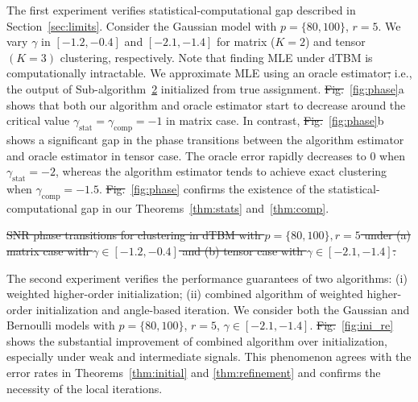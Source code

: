 \documentclass[twoside]{article}
\theoremstyle{definition}
\theoremstyle{definition}
\providecommand{\DIFaddtex}[1]{{\protect\color{blue}\uwave{#1}}} %
\providecommand{\DIFdeltex}[1]{{\protect\color{red}\sout{#1}}}                      %
\providecommand{\DIFaddbegin}{} %
\providecommand{\DIFaddend}{} %
\providecommand{\DIFdelbegin}{} %
\providecommand{\DIFdelend}{} %
\providecommand{\DIFdelFL}[1]{\DIFdel{#1}} %
\providecommand{\DIFadd}[1]{\texorpdfstring{\DIFaddtex{#1}}{#1}} %
\providecommand{\DIFdel}[1]{\texorpdfstring{\DIFdeltex{#1}}{}} %
\newcommand{\DIFscaledelfig}{0.5}
\newlength{\DIFdelgraphicswidth} %
\newlength{\DIFdelgraphicsheight} %
\newcommand{\DIFaddincludegraphics}[2][]{{\color{blue}\fbox{\DIFOincludegraphics[#1]{#2}}}} %
\newcommand{\DIFdelincludegraphics}[2][]{%
\sbox{\DIFdelgraphicsbox}{\DIFOincludegraphics[#1]{#2}}%
\settoboxwidth{\DIFdelgraphicswidth}{\DIFdelgraphicsbox} %
\settoboxtotalheight{\DIFdelgraphicsheight}{\DIFdelgraphicsbox} %
\scalebox{\DIFscaledelfig}{%
\parbox[b]{\DIFdelgraphicswidth}{\usebox{\DIFdelgraphicsbox}\\[-\baselineskip] \rule{\DIFdelgraphicswidth}{0em}}\llap{\resizebox{\DIFdelgraphicswidth}{\DIFdelgraphicsheight}{%
\setlength{\unitlength}{\DIFdelgraphicswidth}%
\begin{picture}(1,1)%
\thicklines\linethickness{2pt} %
{\color[rgb]{1,0,0}\put(0,0){\framebox(1,1){}}}%
{\color[rgb]{1,0,0}\put(0,0){\line( 1,1){1}}}%
{\color[rgb]{1,0,0}\put(0,1){\line(1,-1){1}}}%
\end{picture}%
}\hspace*{3pt}}} %
} %
\DeclareRobustCommand{\DIFaddbegin}{\DIFOaddbegin \let\includegraphics\DIFaddincludegraphics} %
\DeclareRobustCommand{\DIFaddend}{\DIFOaddend \let\includegraphics\DIFOincludegraphics} %
\DeclareRobustCommand{\DIFdelbegin}{\DIFOdelbegin \let\includegraphics\DIFdelincludegraphics} %
\DeclareRobustCommand{\DIFdelend}{\DIFOaddend \let\includegraphics\DIFOincludegraphics} %
\begin{document}
The first experiment verifies  statistical-computational gap described in Section~\ref{sec:limits}. Consider the Gaussian model with $p = \{80, 100\}$, $r = 5$. We vary $\gamma $ in $ [-1.2, -0.4]$ and $[-2.1, -1.4]$ for matrix ($K=2$) and tensor $(K = 3)$ clustering, respectively. Note that finding MLE under dTBM is computationally intractable. We approximate MLE using an oracle estimator\DIFdelbegin \DIFdel{; }\DIFdelend \DIFaddbegin \DIFadd{, }\DIFaddend i.e., the output of Sub-algorithm~\hyperref[alg:main]{2} initialized from true assignment. \DIFdelbegin \DIFdel{Fig.}\DIFdelend \DIFaddbegin \DIFadd{Figure}\DIFaddend ~\ref{fig:phase}a shows that both our algorithm and oracle estimator start to decrease around the critical value $\gamma_{\text{stat}}  = \gamma_{\text{comp}}  = -1$ in matrix case. In contrast, \DIFdelbegin \DIFdel{Fig.}\DIFdelend \DIFaddbegin \DIFadd{Figure}\DIFaddend ~\ref{fig:phase}b shows a significant gap in the phase transitions between the algorithm estimator and oracle estimator in tensor case. The oracle error rapidly decreases to 0 when $\gamma_{\text{stat}} = -2$, whereas the algorithm estimator tends to achieve exact clustering when $\gamma_{\text{comp}} = -1.5$. \DIFdelbegin \DIFdel{Fig.}\DIFdelend \DIFaddbegin \DIFadd{Figure}\DIFaddend ~\ref{fig:phase} confirms the existence of the statistical-computational gap in our Theorems~\ref{thm:stats} and~\ref{thm:comp}. 

\DIFdelbegin %
{%
\DIFdelFL{SNR phase transitions for clustering in dTBM with $p = \{80, 100\}, r = 5$ under (a) matrix case with $\gamma \in [-1.2, -0.4]$ and (b) tensor case with $ \gamma \in [-2.1, -1.4]$.
    }}

\DIFdelend The second experiment verifies the performance guarantees of two algorithms: (i) weighted higher-order initialization; (ii) combined algorithm of weighted higher-order initialization and angle-based iteration. We consider both the Gaussian and Bernoulli models with $p = \{80, 100\}$, $r = 5$, $\gamma \in [-2.1, -1.4]$. %
\DIFdelbegin \DIFdel{Fig.}\DIFdelend \DIFaddbegin \DIFadd{Figure}\DIFaddend ~\ref{fig:ini_re} shows the substantial improvement of combined algorithm over initialization, especially under weak and intermediate signals. This phenomenon agrees with the error rates in Theorems~\ref{thm:initial} and \ref{thm:refinement} 
and confirms the necessity of the local iterations.
\end{document}
